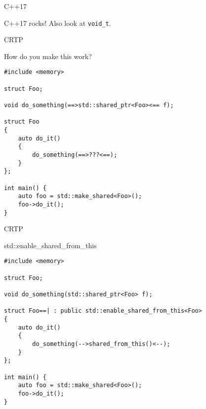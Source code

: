 \documentclass[aspectratio=169,xcolor=dvipsnames]{beamer}
\begin{document}
\begin{frame}[fragile]{C++17}
    \begin{block}{C++17 rocks!}
        Also look at {\tt void\_t}.
   \end{block}
\end{frame}


\begin{frame}[fragile]{CRTP}
        \pause
    \begin{block}{How do you make this work?}
        \begin{lstlisting}
#include <memory>

struct Foo;

void do_something(==>std::shared_ptr<Foo><== f);

struct Foo
{
    auto do_it()
    {
        do_something(==>???<==);
    }
};

int main() {
    auto foo = std::make_shared<Foo>();
    foo->do_it();
}
        \end{lstlisting}
    \end{block}
\end{frame}

\begin{frame}[fragile]{CRTP}
    \begin{block}{std::enable\_shared\_from\_this}
        \begin{lstlisting}
#include <memory>

struct Foo;

void do_something(std::shared_ptr<Foo> f);

struct Foo==| : public std::enable_shared_from_this<Foo>
{
    auto do_it()
    {
        do_something(-->shared_from_this()<--);
    }
};

int main() {
    auto foo = std::make_shared<Foo>();
    foo->do_it();
}
        \end{lstlisting}
    \end{block}
\end{frame}
\end{document}
